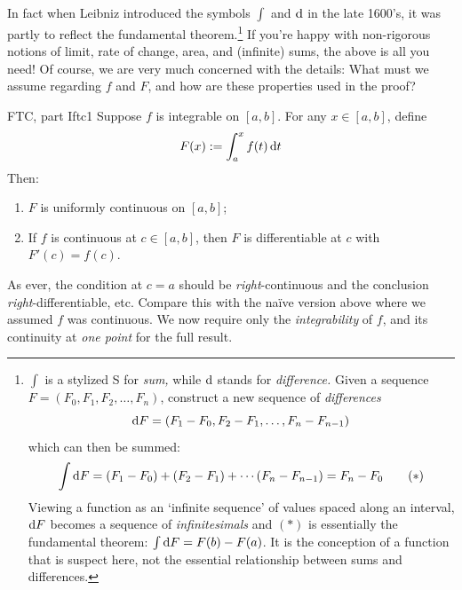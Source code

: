 In fact when Leibniz introduced the symbols $\int$ and $\mathrm{d}$ in the late 1600's, it was partly to reflect the fundamental theorem.\footnote{\def\dF{\D F}$\int$ is a stylized S for \emph{sum,} while $\mathrm{d}$ stands for \emph{difference.} Given a sequence $F=(F_0,F_1,F_2,\ldots,F_n)$, construct a new sequence of \emph{differences}
\[\dF=(F_1-F_0,F_2-F_1,\ldots,F_n-F_{n-1})\]
which can then be summed:
\[\int\dF=(F_1-F_0)+(F_2-F_1)+\cdots (F_n-F_{n-1})=F_n-F_0 \tag{$\ast$}\]
Viewing a function as an `infinite sequence' of values spaced along an interval, $\dF$ becomes a sequence of \emph{infinitesimals} and $(\ast)$ is essentially the fundamental theorem: $\int\dF =F(b)-F(a)$. It is the conception of a function that is suspect here, not the essential relationship between sums and differences.} If you're happy with non-rigorous notions of limit, rate of change, area, and (infinite) sums, the above is all you need!\smallbreak
Of course, we are very much concerned with the details: What must we assume regarding $f$ and $F$, and how are these properties used in the proof?

\begin{thm}{FTC, part I}{ftc1}
Suppose $f$ is integrable on $[a,b]$. For any $x\in[a,b]$, define
\[F(x):=\int_a^xf(t)\,{\mathrm{d} t}\]
Then:
\begin{enumerate}
  \item $F$ is uniformly continuous on $[a,b]$;
  \item If $f$ is continuous at $c\in[a,b]$, then $F$ is differentiable at $c$ with $F'(c)=f(c)$.
\end{enumerate}
\end{thm}

As ever, the condition at $c=a$ should be \emph{right}-continuous and the conclusion \emph{right}-differentiable, etc.\smallbreak
Compare this with the naïve version above where we assumed $f$ was continuous. We now require only the \emph{integrability} of $f$, and its continuity at \emph{one point} for the full result.\goodbreak



